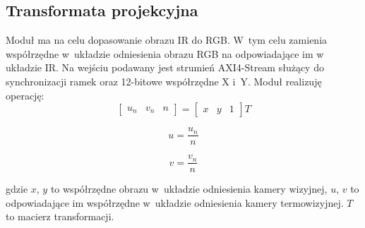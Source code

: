 \subsection {Transformata projekcyjna}

Moduł ma na celu dopasowanie obrazu IR do RGB. 
W~tym celu zamienia współrzędne w~układzie odniesienia obrazu RGB na odpowiadające im w układzie IR. %
Na wejściu podawany jest strumień AXI4-Stream służący do synchronizacji ramek oraz 12-bitowe współrzędne X i~Y. 
Moduł realizuję operację:
\begin{equation}
\begin{bmatrix}
u_n & v_n & n
\end{bmatrix}
=
\begin{bmatrix}
x & y & 1
\end{bmatrix}
T
\end{equation}

\begin{equation}
u = \frac{u_n}{n}
\end{equation}

\begin{equation}
v = \frac{v_n}{n}
\end{equation}

\noindent
gdzie $x$, $y$ to współrzędne obrazu w~układzie odniesienia kamery wizyjnej, $u$, $v$ to odpowiadające im współrzędne w~układzie odniesienia kamery termowizyjnej. 
$T$ to macierz transformacji.

